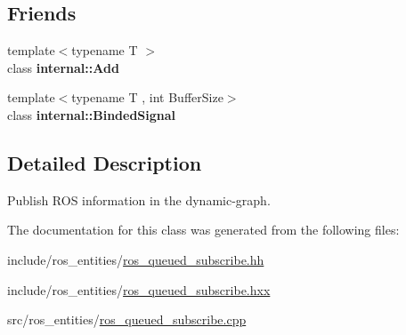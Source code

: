 \subsection*{Friends}
\begin{DoxyCompactItemize}
\item 
{\footnotesize template$<$typename T $>$ }\\class {\bfseries internal\+::\+Add}\hypertarget{classdynamic__graph_1_1RosQueuedSubscribe_aff86e359edc93019ec7be05f8207a40d}{}\label{classdynamic__graph_1_1RosQueuedSubscribe_aff86e359edc93019ec7be05f8207a40d}

\item 
{\footnotesize template$<$typename T , int Buffer\+Size$>$ }\\class {\bfseries internal\+::\+Binded\+Signal}\hypertarget{classdynamic__graph_1_1RosQueuedSubscribe_a9df2fc52f650be6e579db5873effd4e8}{}\label{classdynamic__graph_1_1RosQueuedSubscribe_a9df2fc52f650be6e579db5873effd4e8}

\end{DoxyCompactItemize}


\subsection{Detailed Description}
Publish R\+OS information in the dynamic-\/graph. 

The documentation for this class was generated from the following files\+:\begin{DoxyCompactItemize}
\item 
include/ros\+\_\+entities/\hyperlink{ros__queued__subscribe_8hh}{ros\+\_\+queued\+\_\+subscribe.\+hh}\item 
include/ros\+\_\+entities/\hyperlink{ros__queued__subscribe_8hxx}{ros\+\_\+queued\+\_\+subscribe.\+hxx}\item 
src/ros\+\_\+entities/\hyperlink{ros__queued__subscribe_8cpp}{ros\+\_\+queued\+\_\+subscribe.\+cpp}\end{DoxyCompactItemize}
